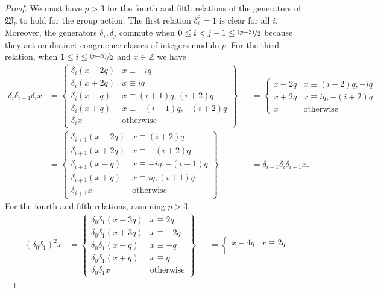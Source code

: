 \documentclass[10pt]{amsart}
\begin{document}
\begin{proof}
We must have $p>3$ for the fourth and fifth relations of the generators of $\mathfrak{W}_p$ to hold for the group action. 
The first relation $\delta_i^2=1$ is clear for all $i$. Moreover, the generators $\delta_i,\delta_j$ commute when $0\leq i<j-1\leq \nicefrac{(p-3)}{2}$ because they act on distinct congruence classes of integers modulo $p$. For the third relation, when $1\leq i\leq\nicefrac{(p-5)}{2}$ and $x\in\mathbb{Z}$ we have 
\begin{align*}
\delta_i\delta_{i+1}\delta_ix&=\left\{\begin{array}{l|l}\delta_i(x-2q)&x\equiv-iq\\
\delta_i(x+2q)&x\equiv iq\\
\delta_i(x-q)&x\equiv(i+1)q,(i+2)q\\
\delta_i(x+q)&x\equiv-(i+1)q,-(i+2)q\\
\delta_ix&\text{otherwise}\end{array}\right\}&&=\left\{\begin{array}{l|l}x-2q&x\equiv(i+2)q,-iq\\
x+2q&x\equiv iq,-(i+2)q\\
x&\text{otherwise}\end{array}\right.\\
&=\left\{\begin{array}{l|l}\delta_{i+1}(x-2q)&x\equiv(i+2)q\\
\delta_{i+1}(x+2q)&x\equiv-(i+2)q\\
\delta_{i+1}(x-q)&x\equiv-iq,-(i+1)q\\
\delta_{i+1}(x+q)&x\equiv iq,(i+1)q\\
\delta_{i+1}x&\text{otherwise}\end{array}\right\}&&=\delta_{i+1}\delta_i\delta_{i+1}x.\end{align*}
For the fourth and fifth relations, assuming $p>3$, 
\begin{align*}(\delta_0\delta_1)^2x&=\left\{\begin{array}{l|l}\delta_0\delta_1(x-3q)&x\equiv2q\\
\delta_0\delta_1(x+3q)&x\equiv-2q\\
\delta_0\delta_1(x-q)&x\equiv-q\\
\delta_0\delta_1(x+q)&x\equiv q\\
\delta_0\delta_1x&\text{otherwise}\end{array}\right\}&&=\left\{\begin{array}{l|l}x-4q&x\equiv2q\\

\end{array}
\end{align*}
\end{proof}
\end{document}
